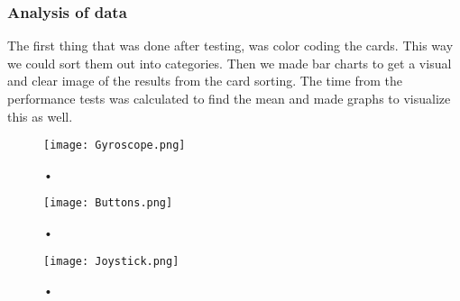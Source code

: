 \subsubsection{Analysis of data}

The first thing that was done after testing, was color coding the cards. This way we could sort them out into categories. 
Then we made bar charts to get a visual and clear image of the results from the card sorting.
The time from the performance tests was calculated to find the mean and made graphs to visualize this as well. 

\begin{figure}[H]
\centering
\texttt{[image: Gyroscope.png]}
\caption{•}
\end{figure}

\begin{figure}[H]
\centering
\texttt{[image: Buttons.png]}
\caption{•}
\end{figure}

\begin{figure}[H]
\centering
\texttt{[image: Joystick.png]}
\caption{•}
\end{figure}

